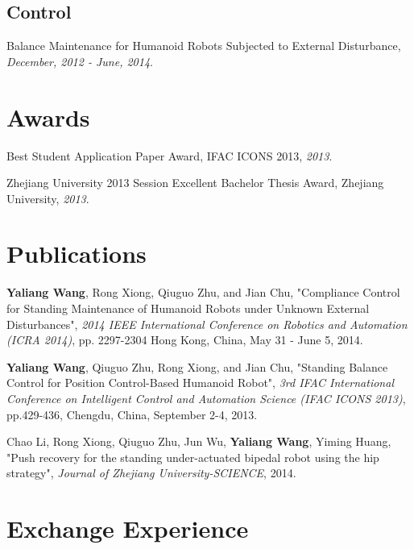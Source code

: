 \documentclass[letterpaper]{article}
\renewenvironment{itemize}{
  \begin{list}{}{
    \setlength{\leftmargin}{1.5em}
  }
}{
  \end{list}
}
\begin{document}
\subsection*{Control}
\begin{itemize}
	\item Balance Maintenance for Humanoid Robots Subjected to External Disturbance, {\it December, 2012 - June, 2014}.
\end{itemize}

\section*{Awards}

\begin{itemize}
  \item Best Student Application Paper Award, IFAC ICONS 2013, {\it  2013}.
  \item Zhejiang University 2013 Session Excellent Bachelor Thesis Award, Zhejiang University, {\it  2013}.
\end{itemize}

\section*{Publications}

\begin{itemize}
\item \textbf{Yaliang Wang}, Rong Xiong, Qiuguo Zhu, and Jian Chu, 
  "Compliance Control for Standing Maintenance of Humanoid Robots under Unknown External Disturbances",
  {\it 2014 IEEE International Conference on Robotics and Automation (ICRA 2014)}, pp. 2297-2304
  Hong Kong, China, May 31 - June 5, 2014.
\item \textbf{Yaliang Wang}, Qiuguo Zhu, Rong Xiong, and Jian Chu, 
  "Standing Balance Control for Position Control-Based Humanoid Robot",
  {\it 3rd IFAC International Conference on Intelligent Control and Automation Science (IFAC ICONS 2013)}, pp.429-436, Chengdu, China, September 2-4, 2013.
\item Chao Li, Rong Xiong, Qiuguo Zhu, Jun Wu, \textbf{Yaliang Wang}, Yiming Huang, "Push recovery for the standing under-actuated bipedal robot using the hip strategy", {\it Journal of Zhejiang University-SCIENCE}, 2014.
\end{itemize}



\section*{Exchange Experience}
\end{document}
